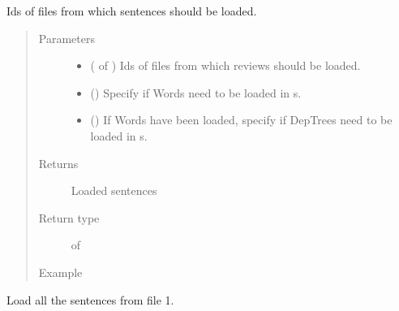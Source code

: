 \documentclass[letterpaper,10pt,english]{sphinxmanual}
\begin{document}
\begin{fulllineitems}
\label{\detokenize{index:loacore.load.sentence_load.load_sentences_by_id_files}}
Ids of files from which sentences should be loaded.
\begin{quote}\begin{description}
\item[{Parameters}] \leavevmode\begin{itemize}
\item {} 
 ( of ) \textendash{} Ids of files from which reviews should be loaded.

\item {} 
 () \textendash{} Specify if Words need to be loaded in  s.

\item {} 
 () \textendash{} If Words have been loaded, specify if DepTrees need to be loaded in  s.

\end{itemize}

\item[{Returns}] \leavevmode
Loaded sentences

\item[{Return type}] \leavevmode
{} of 

\item[{Example}] \leavevmode
\end{description}\end{quote}

Load all the sentences from file 1.

%
\begin{sphinxVerbatim}[commandchars=\\\{\}]
   
  \PYG{p}{[}\PYG{p}{]}
\PYG{p}{[}\PYG{p}{]}
\end{sphinxVerbatim}

\end{fulllineitems}
\end{document}
